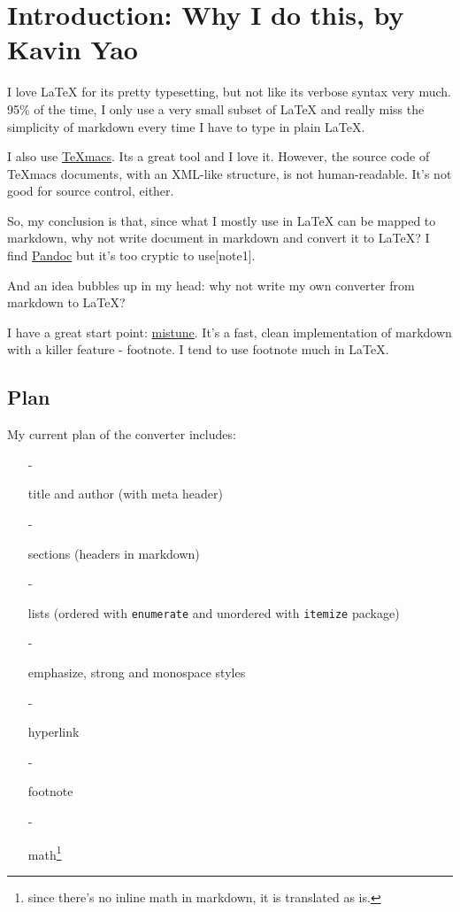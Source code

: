 \documentclass[a4paper, 11pt, titlepage, openany]{article}
\begin{document}
\section{Introduction: Why I do this, by Kavin Yao}

I love \LaTeX{} for its pretty typesetting, but not like its verbose syntax very much. 95\% of the time, I only use a very small subset of \LaTeX{} and really miss the simplicity of markdown every time I have to type in plain \LaTeX{}.

I also use \href{http://www.texmacs.org/tmweb/home/welcome.en.html}{TeX{}macs}. Its a great tool and I love it. However, the source code of TeX{}macs documents, with an XML-like structure, is not human-readable. It's not good for source control, either.

So, my conclusion is that, since what I mostly use in \LaTeX{} can be mapped to markdown, why not write document in markdown and convert it to \LaTeX{}? I find \href{http://johnmacfarlane.net/pandoc/}{Pandoc} but it's too cryptic to use[note1].

And an idea bubbles up in my head: why not write my own converter from markdown to \LaTeX{}?

I have a great start point: \href{https://github.com/lepture/mistune}{mistune}. It's a fast, clean implementation of markdown with a killer feature - footnote. I tend to use footnote much in \LaTeX{}.

\subsection{Plan}

My current plan of the converter includes:

\begin{itemize}
    \item[-] 

title and author (with meta header)
    \item[-] 

sections (headers in markdown)
    \item[-] 

lists (ordered with \texttt{enumerate} and unordered with \texttt{itemize} package)
    \item[-] 

emphasize, strong and monospace styles
    \item[-] 

hyperlink
    \item[-] 

footnote
    \item[-] 

math\footnote{since there's no inline math in markdown, it is translated as is.}
\end{itemize}
\end{document}
